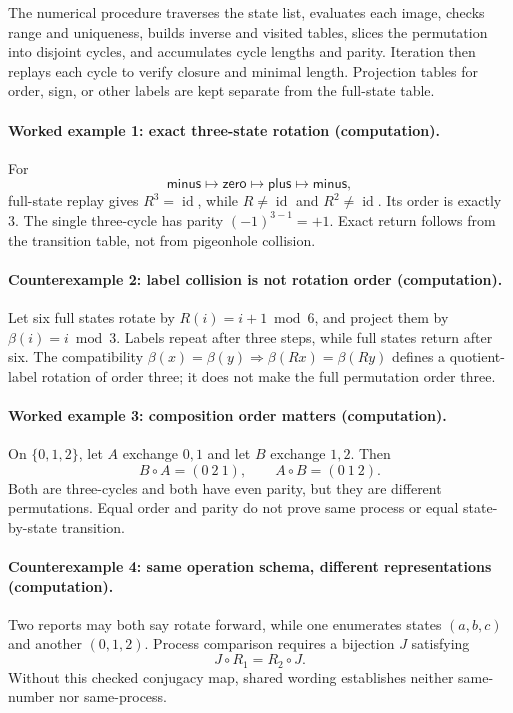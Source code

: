 The numerical procedure traverses the state list, evaluates each image, checks range and uniqueness, builds inverse
and visited tables, slices the permutation into disjoint cycles, and accumulates cycle lengths and parity.  Iteration
then replays each cycle to verify closure and minimal length.  Projection tables for order, sign, or other labels are
kept separate from the full-state table.

\paragraph{Worked example 1: exact three-state rotation (computation).}
For
\[
\mathsf{minus}\mapsto\mathsf{zero}\mapsto\mathsf{plus}\mapsto\mathsf{minus},
\]
full-state replay gives \(R^3=\operatorname{id}\), while \(R\ne\operatorname{id}\) and
\(R^2\ne\operatorname{id}\).  Its order is exactly \(3\).  The single three-cycle has parity
\((-1)^{3-1}=+1\).  Exact return follows from the transition table, not from pigeonhole collision.

\paragraph{Counterexample 2: label collision is not rotation order (computation).}
Let six full states rotate by \(R(i)=i+1\bmod6\), and project them by \(\beta(i)=i\bmod3\).  Labels repeat after
three steps, while full states return after six.  The compatibility
\(\beta(x)=\beta(y)\Rightarrow\beta(Rx)=\beta(Ry)\) defines a quotient-label rotation of order three; it does not
make the full permutation order three.

\paragraph{Worked example 3: composition order matters (computation).}
On \(\{0,1,2\}\), let \(A\) exchange \(0,1\) and let \(B\) exchange \(1,2\).  Then
\[
                   B\circ A=(0\ 2\ 1),\qquad A\circ B=(0\ 1\ 2).
\]
Both are three-cycles and both have even parity, but they are different permutations.  Equal order and parity do not
prove same process or equal state-by-state transition.

\paragraph{Counterexample 4: same operation schema, different representations (computation).}
Two reports may both say rotate forward, while one enumerates states \((a,b,c)\) and another \((0,1,2)\).  Process
comparison requires a bijection \(J\) satisfying
\[
                              J\circ R_1=R_2\circ J.
\]
Without this checked conjugacy map, shared wording establishes neither same-number nor same-process.

